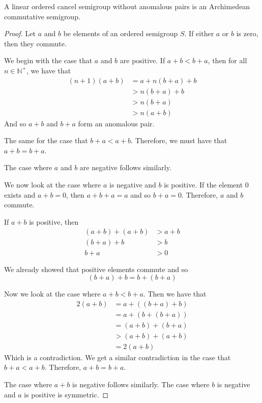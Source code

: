 \begin{theorem}
A linear ordered cancel semigroup without anomalous pairs is an Archimedean commutative semigroup.
\end{theorem}
\begin{proof}
Let $a$ and $b$ be elements of an ordered semigroup $S$.
If either $a$ or $b$ is zero, then they commute.

We begin with the case that $a$ and $b$ are positive.
If $a + b < b + a$, then for all $n\in \mathbb{N}^+$, we have that
\begin{align}
(n+1)(a+b) &= a + n(b+a) + b \\
&> n(b+a) + b \\
&> n(b+a) \\
&> n(a+b)
\end{align}
And so $a+b$ and $b+a$ form an anomalous pair.

The same for the case that $b + a < a + b$.
Therefore, we must have that $a+b = b+a$.

The case where $a$ and $b$ are negative follows similarly.

We now look at the case where $a$ is negative and $b$ is positive.
If the element $0$ exists and $a+b = 0$, then $a + b + a = a$ and so $b+a = 0$.
Therefore, $a$ and $b$ commute.

If $a + b$ is positive, then
\begin{align}
(a+b) + (a+b) &> a + b \\
(b + a) + b &> b \\
b + a &> 0
\end{align}

We already showed that positive elements commute and so
\[ (b+a) + b = b + (b + a)\]

Now we look at the case where $a+b < b+a$.
Then we have that
\begin{align}
2(a + b) &= a + ((b+a) + b) \\
&= a + (b + (b + a)) \\
&= (a + b) + (b + a) \\
&> (a + b) + (a + b) \\
&= 2(a + b)
\end{align}
Which is a contradiction.
We get a similar contradiction in the case that $b+a < a+b$.
Therefore, $a+b = b+a$.

The case where $a+b$ is negative follows similarly.
The case where $b$ is negative and $a$ is positive is symmetric.
\end{proof}